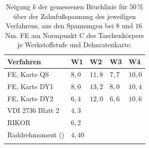 \begin{table}[htbp]
	\caption{Neigung $k$ der gemessenen Bruchlinie für $50$\,\% über der Zahnfußspannung des jeweiligen Verfahrens, aus den Spannungen bei $8$ und $16$\,Nm. FE am Normpunkt C des Taschenkörpers je Werkstoffstufe und Dehnratenkarte.}
	\label{tab:neigung_verfahren}
	\centering
	\footnotesize
	\begin{tabular}{L{3.2cm}L{1.2cm}L{1.2cm}L{1.2cm}L{1.2cm}}
		Verfahren                                  & W1                                & W2       & W3      & W4       \\
		\hline
		FE, Karte QS                               & $8{,}0$                           & $11{,}8$ & $7{,}7$ & $10{,}0$ \\
		\hline
		FE, Karte DY1                              & $8{,}0$                           & $13{,}2$ & $8{,}0$ & $10{,}4$ \\
		\hline
		FE, Karte DY2                              & $6{,}4$                           & $12{,}0$ & $6{,}6$ & $10{,}6$ \\
		\hline
		VDI 2736 Blatt 2                           &                                        \\
		\hline
		RIKOR                                      &                                  \\
		\hline
		Raddrehmoment () &                                       \\
		\hline
	\end{tabular}
\end{table}



